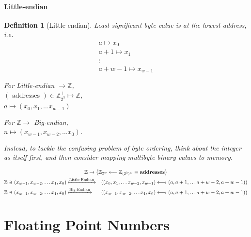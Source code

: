 \documentclass[10pt]{amsart}
\newtheorem{definition}{Definition}
\begin{document}
\begin{multicols*}{2}
\subsection{Little-endian}

\begin{definition}[Little-endian]
Least-significant byte value is at the lowest address, i.e.
\begin{equation}
\begin{gathered}
a \mapsto x_0 \\
a + 1 \mapsto x_1 \\
\vdots \\
a+w - 1 \mapsto x_{w-1}
\end{gathered}
\end{equation}

For Little-endian $\to \mathbb{Z}$, \\
$( \text{ addresses } ) \in \mathbb{Z}^+_{2^3} \mapsto \mathbb{Z}$, \\
$a \mapsto (x_0, x_1, \dots x_{w-1})$

For $\mathbb{Z} \to $ Big-endian, \\
$n \mapsto (x_{w-1}, x_{w-2}, \dots x_0)$.

Instead, to tackle the confusing problem of byte ordering, think about the integer as itself first, and then consider \emph{mapping multibyte binary values to memory}.

\begin{equation}
\begin{gathered}
\mathbb{Z} \to \left( \mathbb{Z}_{2^w} \longleftarrow \mathbb{Z}_{(2^3)^w} = \textbf{addresses}  \right) \\
\begin{aligned}
& \mathbb{Z} \ni (x_{w-1}, x_{w-2}, \dots x_1, x_0) \xmapsto{\text{Little-Endian}}  & \left((x_0, x_1 , \dots x_{w-2}, x_{w-1}) \longleftarrow\!\shortmid \,  (a, a+1, \dots a + w-2, a+w-1)\right) \\
& \mathbb{Z} \ni (x_{w-1}, x_{w-2}, \dots x_1, x_0) \xmapsto{\text{Big-Endian}}  & \left((x_{w-1}, x_{w-2} , \dots x_{1}, x_{0}) \longleftarrow\!\shortmid \,  (a, a+1, \dots a + w-2, a+w-1)\right) 
\end{aligned}
\end{gathered}
\end{equation}
	
\end{definition}

\part{Floating Point Numbers}


\end{multicols*}
\end{document}

